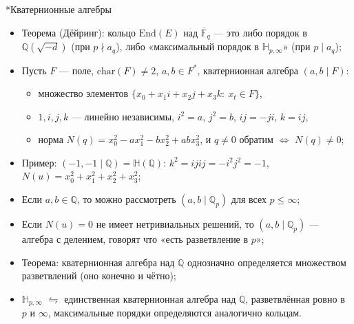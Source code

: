 \documentclass[serif, aspectratio=169]{beamer}
\begin{document}
\begin{frame}{*Кватернионные алгебры}
    \begin{itemize}
        \item Теорема (Дёйринг): кольцо $\mathrm{End}(E)$ над $\overline{\mathbb{F}}_q$ --- это либо порядок в $\mathbb{Q}(\sqrt{-d})$ (при $p\nmid a_q$), либо «максимальный порядок в $\mathbb{H}_{p,\infty}$» (при $p\mid a_q$);
        \item Пусть $F$ --- поле, $\mathrm{char}(F)\neq 2$, $a,b\in F^*$, кватернионная алгебра $(a,b\mid F)$: 
        \begin{itemize}
            \item множество элементов $\{x_0+x_1i+x_2j+x_3k:\ x_t\in F\}$,
            \item $1,i,j,k$ --- линейно независимы, $i^2=a$, $j^2=b$, $ij=-ji$, $k=ij$,
            \item норма $N(q)=x_0^2-ax_1^2-bx_2^2+abx_3^2$, и $q\neq0$ обратим $\Leftrightarrow$ $N(q)\neq0$;
        \end{itemize}
        \item Пример: $(-1,-1\mid \mathbb{Q})=\mathbb{H}(\mathbb{Q})$: $k^2=ijij=-i^2j^2=-1$, $N(u)=x_0^2+x_1^2+x_2^2+x_3^2$;
        \item Если $a,b\in\mathbb{Q}$, то можно рассмотреть
        $(a,b\mid \mathbb{Q}_p)$
        для всех $p\leqslant\infty$;
        \item Если $N(u)=0$ не имеет нетривиальных решений, то $(a,b\mid \mathbb{Q}_p)$ --- алгебра с делением, говорят что «есть разветвление в $p$»;
        \item Теорема: кватернионная алгебра над $\mathbb{Q}$
        однозначно определяется множеством разветвлений (оно конечно и чётно);
        \item $\mathbb{H}_{p,\infty}$ $\leftrightharpoons$ единственная кватернионная
        алгебра над $\mathbb{Q}$, разветвлённая ровно в $p$ и $\infty$, максимальные порядки определяются аналогично кольцам.
    \end{itemize}
    
\end{frame}
\end{document}
